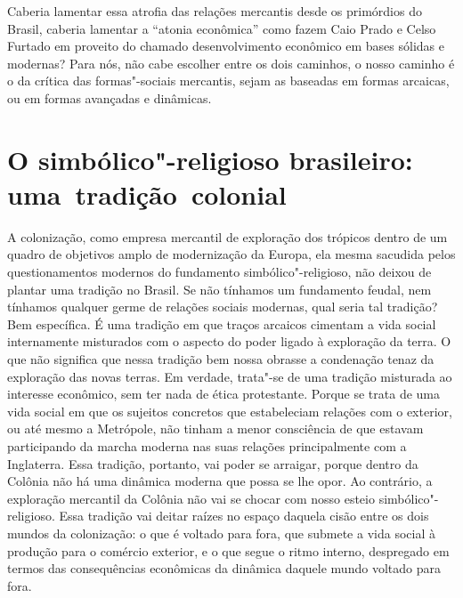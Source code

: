 Caberia lamentar essa atrofia das relações mercantis desde os primórdios
do Brasil, caberia lamentar a ``atonia econômica'' como fazem Caio Prado
e Celso Furtado em proveito do chamado desenvolvimento econômico em
bases sólidas e modernas? Para nós, não cabe escolher entre os dois
caminhos, o nosso caminho é o da crítica das formas"-sociais mercantis,
sejam as baseadas em formas arcaicas, ou em formas avançadas e
dinâmicas.

\section{O simbólico"-religioso brasileiro: uma~tradição~colonial}

A colonização, como empresa mercantil de exploração dos trópicos dentro
de um quadro de objetivos amplo de modernização da Europa, ela mesma
sacudida pelos questionamentos modernos do fundamento
simbólico"-religioso, não deixou de plantar uma tradição no Brasil. Se
não tínhamos um fundamento feudal, nem tínhamos qualquer germe de
relações sociais modernas, qual seria tal tradição? Bem específica. É
uma tradição em que traços arcaicos cimentam a vida social internamente
misturados com o aspecto do poder ligado à exploração da terra. O que
não significa que nessa tradição bem nossa obrasse a condenação tenaz da
exploração das novas terras. Em verdade, trata"-se de uma tradição
misturada ao interesse econômico, sem ter nada de ética protestante.
Porque se trata de uma vida social em que os sujeitos concretos que
estabeleciam relações com o exterior, ou até mesmo a Metrópole, não
tinham a menor consciência de que estavam participando da marcha moderna
nas suas relações principalmente com a Inglaterra. Essa tradição,
portanto, vai poder se arraigar, porque dentro da Colônia não há uma
dinâmica moderna que possa se lhe opor. Ao contrário, a exploração
mercantil da Colônia não vai se chocar com nosso esteio
simbólico"-religioso. Essa tradição vai deitar raízes no espaço daquela
cisão entre os dois mundos da colonização: o que é voltado para fora,
que submete a vida social à produção para o comércio exterior, e o que
segue o ritmo interno, despregado em termos das consequências econômicas
da dinâmica daquele mundo voltado para fora.

